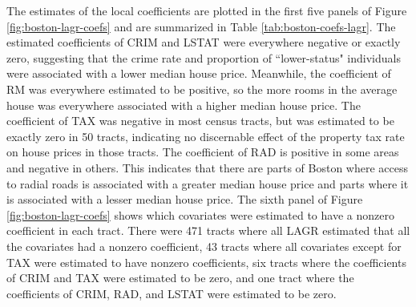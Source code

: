 \documentclass[authoryear,review, 12pt]{elsarticle}
\begin{document}
The estimates of the local coefficients are plotted in the first five panels of Figure \ref{fig:boston-lagr-coefs} and are summarized in Table \ref{tab:boston-coefs-lagr}.
The estimated coefficients of CRIM and LSTAT were everywhere negative or exactly zero, suggesting that the crime rate and proportion of ``lower-status" individuals were associated with a lower median house price. 
Meanwhile, the coefficient of RM was everywhere estimated to be positive, so the more rooms in the average house was everywhere associated with a higher median house price.
The coefficient of TAX was negative in most census tracts, but was estimated to be exactly zero in 50 tracts, indicating no discernable effect of the property tax rate on house prices in those tracts.
The coefficient of RAD is positive in some areas and negative
in others. This indicates that there are parts of Boston where access
to radial roads is associated with a greater median house price and
parts where it is associated with a lesser median house price.
The sixth panel of Figure \ref{fig:boston-lagr-coefs} shows which covariates were estimated to have a nonzero coefficient in each tract.
There were 471 tracts where all LAGR estimated that all the covariates had a nonzero coefficient, 43 tracts where all covariates except for TAX were estimated to have nonzero coefficients, six tracts where the coefficients of CRIM and TAX were estimated to be zero, and one tract where the coefficients of CRIM, RAD, and LSTAT were estimated to be zero.

\end{document}
